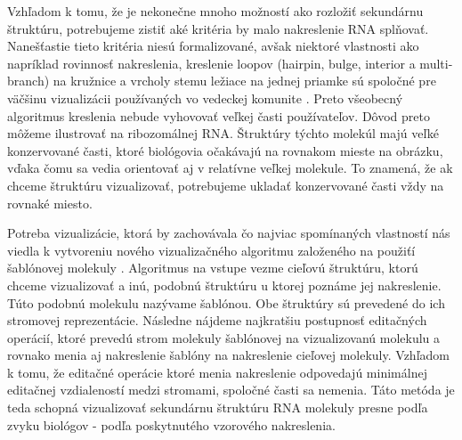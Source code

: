 Vzhľadom k tomu, že je nekonečne mnoho možností ako rozložiť sekundárnu štruktúru,
potrebujeme zistiť aké kritéria by malo nakreslenie RNA splňovať. Nanešťastie
tieto kritéria niesú formalizované, avšak niektoré vlastnosti ako napríklad
rovinnosť nakreslenia, kreslenie loopov (hairpin, bulge, interior a multi-branch)
na kružnice a vrcholy stemu ležiace na jednej priamke sú spoločné pre väčšinu
vizualizácii používaných vo vedeckej komunite .
Preto všeobecný algoritmus kreslenia nebude vyhovovať veľkej časti používateľov.
Dôvod preto môžeme ilustrovať na ribozomálnej RNA. Štruktúry týchto molekúl
majú veľké konzervované časti, ktoré biológovia očakávajú na rovnakom mieste
na obrázku, vďaka čomu sa vedia orientovať aj v relatívne veľkej molekule.
To znamená, že ak chceme štruktúru vizualizovať, potrebujeme ukladať
konzervované časti vždy na rovnaké miesto.

Potreba vizualizácie, ktorá by zachovávala čo najviac spomínaných vlastností
nás viedla k vytvoreniu nového vizualizačného algoritmu založeného na
použiťí šablónovej molekuly . Algoritmus na vstupe vezme cieľovú
štruktúru, ktorú chceme vizualizovať a inú, podobnú štruktúru u ktorej poznáme jej
nakreslenie. Túto podobnú molekulu nazývame šablónou. Obe štruktúry sú
prevedené do ich stromovej reprezentácie. Následne nájdeme najkratšiu postupnosť
editačných operácií, ktoré prevedú strom molekuly šablónovej na vizualizovanú
molekulu a rovnako menia aj nakreslenie šablóny na nakreslenie cieľovej molekuly.
Vzhľadom k tomu, že editačné operácie ktoré menia nakreslenie odpovedajú
minimálnej editačnej vzdialeností medzi stromami, spoločné časti sa nemenia.
Táto metóda je teda schopná vizualizovať sekundárnu štruktúru RNA
molekuly presne podľa zvyku biológov - podľa poskytnutého vzorového
nakreslenia.


